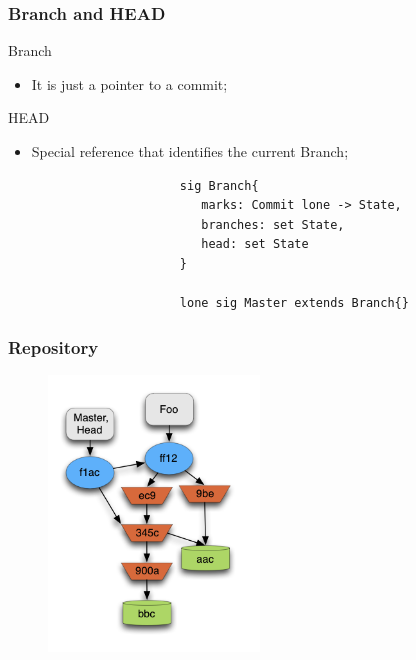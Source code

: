 \documentclass{beamer}
\begin{document}
\begin{frame}[fragile]
\frametitle{Branch and HEAD}
   \begin{block}{Branch}
      \begin{itemize}
         \item It is just a pointer to a commit;
      \end{itemize}
   \end{block}
   \begin{block}{HEAD}
      \begin{itemize} 
         \item Special reference that identifies the current Branch;
      \end{itemize}
   \end{block}
   \tiny
   \color{blue}
   \begin{lstlisting}
                        sig Branch{
                           marks: Commit lone -> State,
                           branches: set State,
                           head: set State
                        }

                        lone sig Master extends Branch{}
   \end{lstlisting}
\end{frame}

\begin{frame}
	\frametitle{Repository}
	\begin{figure}
		\centering
		\includegraphics[width=0.5\textwidth]{images/object_assoc.png}
	\end{figure}
\end{frame}
\end{document}
